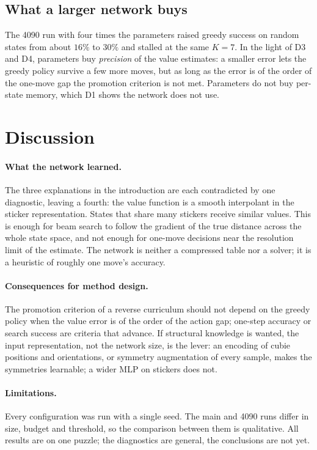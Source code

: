 \documentclass[11pt]{article}
\begin{document}
\subsection{What a larger network buys}

The 4090 run with four times the parameters raised greedy success on random states from about
$16\%$ to $30\%$ and stalled at the same $K=7$. In the light of D3 and D4, parameters buy
\emph{precision} of the value estimates: a smaller error lets the greedy policy survive a few
more moves, but as long as the error is of the order of the one-move gap the promotion criterion
is not met. Parameters do not buy per-state memory, which D1 shows the network does not use.

\section{Discussion}

\paragraph{What the network learned.}
The three explanations in the introduction are each contradicted by one diagnostic, leaving a
fourth: the value function is a smooth interpolant in the sticker representation. States that
share many stickers receive similar values. This is enough for beam search to follow the
gradient of the true distance across the whole state space, and not enough for one-move
decisions near the resolution limit of the estimate. The network is neither a compressed table
nor a solver; it is a heuristic of roughly one move's accuracy.

\paragraph{Consequences for method design.}
The promotion criterion of a reverse curriculum should not depend on the greedy policy when the
value error is of the order of the action gap; one-step accuracy or search success are
criteria that advance. If structural knowledge is wanted, the input representation, not the
network size, is the lever: an encoding of cubie positions and orientations, or symmetry
augmentation of every sample, makes the symmetries learnable; a wider MLP on stickers does not.

\paragraph{Limitations.}
Every configuration was run with a single seed. The main and 4090 runs differ in size, budget
and threshold, so the comparison between them is qualitative.
All results are on one puzzle; the diagnostics are general, the conclusions are not yet.
\end{document}
